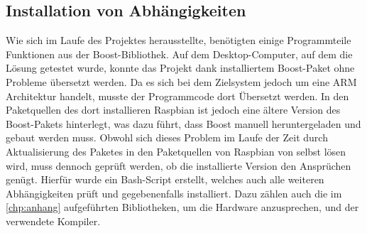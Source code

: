 \subsection{Installation von Abhängigkeiten}\label{kap:ums:abh}
Wie sich im Laufe des Projektes herausstellte, benötigten einige Programmteile Funktionen aus der Boost-Bibliothek.\cite{BOOK:BOOST} Auf dem Desktop-Computer, auf dem die Lösung getestet wurde, konnte das Projekt dank installiertem Boost-Paket ohne Probleme übersetzt werden. Da es sich bei dem Zielsystem jedoch um eine ARM Architektur handelt, musste der Programmcode dort Übersetzt werden. In den Paketquellen des dort installieren Raspbian ist jedoch eine ältere Version des Boost-Pakets hinterlegt, was dazu führt, dass Boost manuell heruntergeladen und gebaut werden muss. Obwohl sich dieses Problem im Laufe der Zeit durch Aktualisierung des Paketes in den Paketquellen von Raspbian von selbst lösen wird, muss dennoch geprüft werden, ob die installierte Version den Ansprüchen genügt. Hierfür wurde ein Bash-Script erstellt, welches auch alle weiteren Abhängigkeiten prüft und gegebenenfalls installiert. Dazu zählen auch die im  \autoref{chp:anhang}  aufgeführten Bibliotheken, um die Hardware anzusprechen, und der verwendete Kompiler. 

\clearpage


